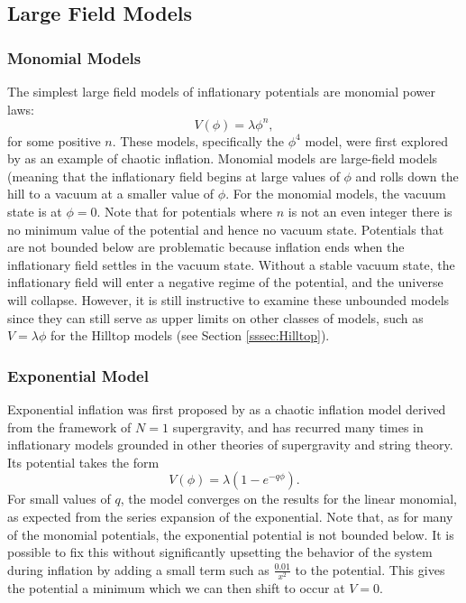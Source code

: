 \documentclass[a4paper,11pt]{article}
\begin{document}
\subsection{Large Field Models}
\label{ssec:LargeField}

\subsubsection{Monomial Models}
\label{sssec:Mono}
The simplest large field models of inflationary potentials are monomial power laws: 
\begin{equation}
V(\phi)=\lambda\phi^n,
\end{equation} 
for some positive $n$. These models, specifically the $\phi^4$ model, were first explored by \citet{Linde1983} as an example of chaotic inflation. Monomial models are large-field models (meaning that the inflationary field begins at large values of $\phi$ and rolls down the hill to a vacuum at a smaller value of $\phi$. For the monomial models, the vacuum state is at $\phi=0$. Note that for potentials where $n$ is not an even integer there is no minimum value of the potential and hence no vacuum state. Potentials that are not bounded below are problematic because inflation ends when the inflationary field settles in the vacuum state. Without a stable vacuum state, the inflationary field will enter a negative regime of the potential, and the universe will collapse. However, it is still instructive to examine these unbounded models since they can still serve as upper limits on other classes of models, such as $V=\lambda\phi$ for the Hilltop models (see Section \ref{sssec:Hilltop}).

\subsubsection{Exponential Model}
Exponential inflation was first proposed by \citet{Goncharov+Linde1984} as a chaotic inflation model derived from the framework of $N=1$ supergravity, and has recurred many times in inflationary models grounded in other theories of supergravity and string theory. Its potential takes the form
\begin{equation}
V(\phi)=\lambda(1-e^{-q\phi}).
\end{equation} 
For small values of $q$, the model converges on the results for the linear monomial, as expected from the series expansion of the exponential. Note that, as for many of the monomial potentials, the exponential potential is not bounded below. It is possible to fix this without significantly upsetting the behavior of the system during inflation by adding a small term such as $\tfrac{0.01}{x^2}$ to the potential. This gives the potential a minimum which we can then shift to occur at $V=0$. 
\end{document}
